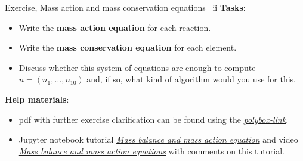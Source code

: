 %
\begin{frame}{Exercise, Mass action and mass conservation equations \, ii}
\textbf{Tasks}:
\begin{itemize}
\item Write the \textbf{mass action equation }for each reaction.
\item Write the \textbf{mass conservation equation }for each element.
\item Discuss whether this system of equations are enough to compute $n=(n_{1},\ldots,n_{10})$
and, if so, what kind of algorithm would you use for this.
\end{itemize}
\textbf{Help materials}: 
\begin{itemize}
\item pdf with further exercise clarification can be found using the 
\href{https://polybox.ethz.ch/index.php/s/EPMn4pJtIOL7VFS}{\textcolor{indigo(dye)}{\it polybox-link}}.
\item Jupyter notebook tutorial \href{https://github.com/mtsveta/reaktoro-jupyter/blob/geofluids-examples/tutorial/eq.mass-balance-mass-action.ipynb}{\textcolor{indigo(dye)}{\it Mass balance and mass action equation}} and 
video 
\href{https://polybox.ethz.ch/index.php/s/qStBnxUnry648U5}{\textcolor{indigo(dye)}{\it Mass balance and mass action equations}} with comments on this tutorial.
\end{itemize}
\end{frame}
%
%
